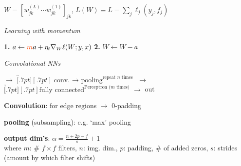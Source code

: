 $W \!=\! [w_{jk}^{(L)} \cdots w_{jk}^{(1)}]_{jk}$, \hfill $L(W) \!\equiv\! L = \sum_j\ell_j(y_j,f_j)$

\emph{Learning with momentum}
\begin{highlightbox}
	\textbf{1.} $a \leftarrow {\color{OrangeRed}m} a + \eta_t \nabla_W \ell(W;y,x)$\enskip
	\textbf{2.} $W \leftarrow W \!-\! a$
\end{highlightbox}

\emph{Convolutional NNs}

$\to$ $\overbracket[.7pt][.7pt]{\text{conv. $\to$ pooling}}^{\text{repeat $n$ times}}$
$\to$ $\overbracket[.7pt][.7pt]{\text{fully connected}}^{\text{Perceptron ($m$ times)}}$ $\to$ out

\textbf{Convolution}: for edge regions $\to$ 0-padding

\textbf{pooling} (subsampling): e.g. `max' pooling

\textbf{output dim's}:
$\alpha = \frac{n+2p-f}{s}+1$\\
{\small
where $m$: \# $f\times f$ filters,\enskip
$n$: img. dim.,\enskip
$p$: padding, \# of added zeros,\enskip
$s$: strides (amount by which filter shifts)
}
